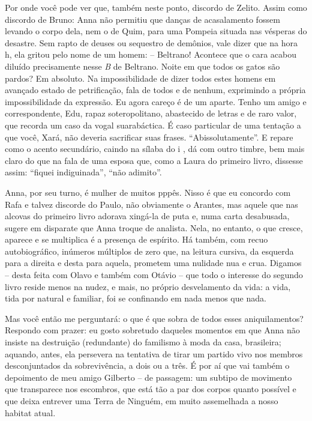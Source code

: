 Por onde você pode ver que, também neste ponto, discordo de Zelito.
Assim como discordo de Bruno: Anna não permitiu que danças de
acasalamento fossem levando o corpo dela, nem o de Quim, para uma
Pompeia situada nas vésperas do desastre. Sem rapto de deuses ou
sequestro de demônios, vale dizer que na hora h, ela gritou pelo nome de
um homem: -- Beltrano! Acontece que o cara acabou diluído precisamente
nesse \emph{B} de Beltrano. Noite em que todos os gatos são pardos? Em
absoluto. Na impossibilidade de dizer todos estes homens em avançado
estado de petrificação, fala de todos e de nenhum, exprimindo a própria
impossibilidade da expressão. Eu agora careço é de um aparte. Tenho um
amigo e correspondente, Edu, rapaz soteropolitano, abastecido de letras
e de raro valor, que recorda um caso da vogal suarabáctica. É caso
particular de uma tentação a que você, Xará, não deveria sacrificar suas
frases. ``Abissolutamente''. E repare como o acento secundário, caindo
na sílaba do i , dá com outro timbre, bem mais claro do que na fala de
uma esposa que, como a Laura do primeiro livro, dissesse assim: ``fiquei
indiguinada'', ``não adimito''.

Anna, por seu turno, é mulher de muitos pppês. Nisso é que eu concordo
com Rafa e talvez discorde do Paulo, não obviamente o Arantes, mas
aquele que nas alcovas do primeiro livro adorava xingá-la de puta e,
numa carta desabusada, sugere em disparate que Anna troque de analista.
Nela, no entanto, o que cresce, aparece e se multiplica é a presença de
espírito. Há também, com recuo autobiográfico, inúmeros múltiplos de
zero que, na leitura cursiva, da esquerda para a direita e desta para
aquela, prometem uma nulidade nua e crua. Digamos -- desta feita com
Olavo e também com Otávio -- que todo o interesse do segundo livro
reside menos na nudez, e mais, no próprio desvelamento da vida: a vida,
tida por natural e familiar, foi se confinando em nada menos que nada.

Mas você então me perguntará: o que é que sobra de todos esses
aniquilamentos? Respondo com prazer: eu gosto sobretudo daqueles
momentos em que Anna não insiste na destruição (redundante) do familismo
à moda da casa, brasileira; aquando, antes, ela persevera na tentativa
de tirar um partido vivo nos membros desconjuntados da sobrevivência, a
dois ou a três. É por aí que vai também o depoimento de meu amigo
Gilberto -- de passagem: um subtipo de movimento que transparece nos
escombros, que está tão a par dos corpos quanto possível e que deixa
entrever uma Terra de Ninguém, em muito assemelhada a nosso habitat
atual.

